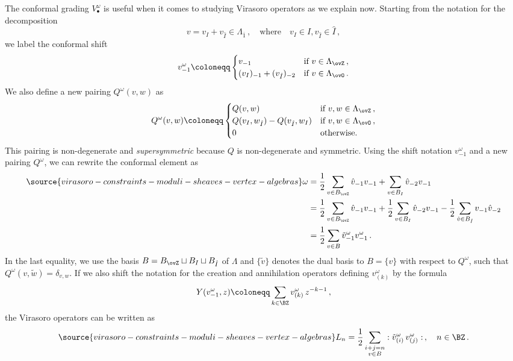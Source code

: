 The conformal grading $V_\bullet^\omega$ is useful when it comes to studying Virasoro operators as we explain now. Starting from the notation for the decomposition
$$v=v_I+v_{\hat{I}}\in \Lambda_{\overline{1}} \,,\quad \text{where}\quad  v_{I}\in I, v_{\hat{I}}\in\hat{I}\,,$$
we label the conformal shift
$$v^{\omega}_{-1}\coloneqq \begin{cases}
v_{-1}& \textnormal{if }v\in \Lambda_{\ovZ}\,,\\
(v_I)_{-1}+(v_{\hat{I}})_{-2}& \textnormal{if }v\in \Lambda_{\ovO}\,.
\end{cases}
$$
We also define a new pairing $Q^\omega(v,w)$ as
$$Q^\omega(v,w)\coloneqq
\begin{cases}
Q(v,w)&\textnormal{if }v,w\in \Lambda_{\ovZ}\,,\\
Q(v_I,w_{\hat{I}})-Q(v_{\hat{I}},w_I)&\textnormal{if }v,w\in \Lambda_{\ovO}\,,\\
0&\textnormal{otherwise.}
\end{cases}
$$
This pairing is non-degenerate and {\it supersymmetric} because $Q$ is non-degenerate and symmetric. Using the shift notation $v^\omega_{-1}$ and a new pairing $Q^\omega$, we can rewrite the conformal element as
\begin{align}\label{Eq: omega}
\source{virasoro-constraints-moduli-sheaves-vertex-algebras}
    \omega
    &=\frac{1}{2}\sum_{v\in B_{\ovZ}}\hat{v}_{-1}v_{-1}+\sum_{v\in B_I}\hat{v}_{-2}v_{-1}\\
    &=\frac{1}{2}\sum_{v\in B_{\ovZ}}\hat{v}_{-1}v_{-1}
    +\frac{1}{2}\sum_{v\in B_I}\hat{v}_{-2}v_{-1}-\frac{1}{2}\sum_{\hat{v}\in B_{\hat{I}}}v_{-1}\hat{v}_{-2}\nonumber\\
    &=\frac{1}{2}\sum_{v\in B} \tilde{v}^\omega_{-1}v^\omega_{-1}\nonumber\,.
\end{align}
In the last equality, we use the basis $B=B_{\ovZ}\sqcup B_I\sqcup B_{\hat{I}}$ of $\Lambda$ and $\{\tilde{v}\}$ denotes the dual basis to $B=\{v\}$ with respect to $Q^\omega$, such that $Q^\omega(v,\tilde{w})=\delta_{v,w}$. If we also shift the notation for the creation and annihilation operators defining $v^\omega_{(k)}$ by the formula
$$Y(v^\omega_{-1},z)\coloneqq \sum_{k\in \BZ}v^\omega_{(k)}\,z^{-k-1}\,,
$$
the Virasoro operators can be written as
\begin{equation}\label{eq: operatorsomegashift}
\source{virasoro-constraints-moduli-sheaves-vertex-algebras}
L_n=\frac{1}{2}\sum_{\substack{i+j=n\\ v\in B}} :\tilde{v}^\omega_{(i)}\,v^\omega_{(j)}:\,,\quad n\in \BZ\,.
\end{equation}

